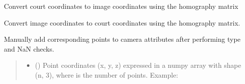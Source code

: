 \documentclass[letterpaper,10pt,english]{sphinxmanual}
\begin{document}
\begin{fulllineitems}
\begin{fulllineitems}
\end{fulllineitems}


\begin{fulllineitems}
\label{\detokenize{CameraUtils:CameraUtils.Camera.Court2Image}}
\pysigstartsignatures
{}
\pysigstopsignatures
\sphinxAtStartPar
Convert court coordinates to image coordinates using the homography matrix

\end{fulllineitems}


\begin{fulllineitems}
\label{\detokenize{CameraUtils:CameraUtils.Camera.Image2Court}}
\pysigstartsignatures
{}
\pysigstopsignatures
\sphinxAtStartPar
Convert image coordinates to court coordinates using the homography matrix.

\end{fulllineitems}


\begin{fulllineitems}
\label{\detokenize{CameraUtils:id0}}
\pysigstartsignatures
{}
\pysigstopsignatures
\sphinxAtStartPar
Manually add corresponding points to camera attributes after performing type and NaN checks.
\begin{quote}\begin{description}
\begin{itemize}
\item {} 
\sphinxAtStartPar
{} () \textendash{} Point coordinates (x, y, z) expressed in a numpy array with shape (n, 3),
where  is the number of points. Example: \sphinxtitleref{{[}{[}x, y, z{]}, …{]}}


\end{itemize}
\end{description}
\end{quote}
\end{fulllineitems}
\end{fulllineitems}
\end{document}
